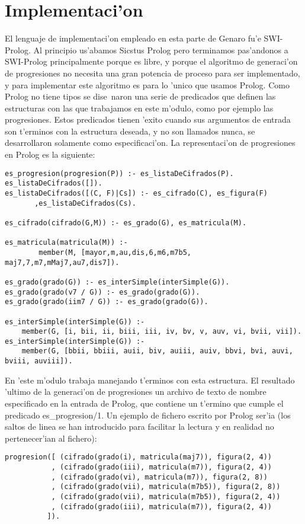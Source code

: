 \documentclass[a4paper,12pt]{article}
\begin{document}
\section {Implementaci'on}
El lenguaje de implementaci'on empleado en esta parte de Genaro fu'e SWI-Prolog. Al principio us'abamos Sicstus Prolog pero terminamos pas'andonos a SWI-Prolog principalmente porque es libre, y porque el algoritmo de generaci'on de progresiones no necesita una gran potencia de proceso para ser implementado, y para implementar este algoritmo es para lo 'unico que usamos Prolog.
\newline
Como Prolog no tiene tipos se dise~naron una serie de predicados que definen las estructuras con las que trabajamos en este m'odulo, como por ejemplo las progresiones. Estos predicados tienen 'exito cuando sus argumentos de entrada son t'erminos con la estructura deseada, y no son llamados nunca, se desarrollaron solamente como especificaci'on.
\newline
La representaci'on de progresiones en Prolog es la siguiente:
        \begin{verbatim}
es_progresion(progresion(P)) :- es_listaDeCifrados(P).
es_listaDeCifrados([]).
es_listaDeCifrados([(C, F)|Cs]) :- es_cifrado(C), es_figura(F)
       ,es_listaDeCifrados(Cs).

es_cifrado(cifrado(G,M)) :- es_grado(G), es_matricula(M).

es_matricula(matricula(M)) :- 
        member(M, [mayor,m,au,dis,6,m6,m7b5, maj7,7,m7,mMaj7,au7,dis7]).

es_grado(grado(G)) :- es_interSimple(interSimple(G)).
es_grado(grado(v7 / G)) :- es_grado(grado(G)).
es_grado(grado(iim7 / G)) :- es_grado(grado(G)).

es_interSimple(interSimple(G)) :-
	member(G, [i, bii, ii, biii, iii, iv, bv, v, auv, vi, bvii, vii]).
es_interSimple(interSimple(G)) :-
	member(G, [bbii, bbiii, auii, biv, auiii, auiv, bbvi, bvi, auvi, bviii, auviii]).
        \end{verbatim}
En 'este m'odulo trabaja manejando t'erminos con esta estructura. El resultado 'ultimo de la generaci'on de progresiones un archivo de texto de nombre especificado en la entrada de Prolog, que contiene un t'ermino que cumple el predicado es\_progresion/1. Un ejemplo de fichero escrito por Prolog ser'ia (los saltos de linea se han introducido para facilitar la lectura y en realidad no pertenecer'ian al fichero):
        \begin{verbatim}
progresion([ (cifrado(grado(i), matricula(maj7)), figura(2, 4))
           , (cifrado(grado(iii), matricula(m7)), figura(2, 4))
           , (cifrado(grado(vi), matricula(m7)), figura(2, 8))
           , (cifrado(grado(vii), matricula(m7b5)), figura(2, 8))
           , (cifrado(grado(vii), matricula(m7b5)), figura(2, 4))
           , (cifrado(grado(iii), matricula(m7)), figura(2, 4))
          ]).
        \end{verbatim}
\end{document}

